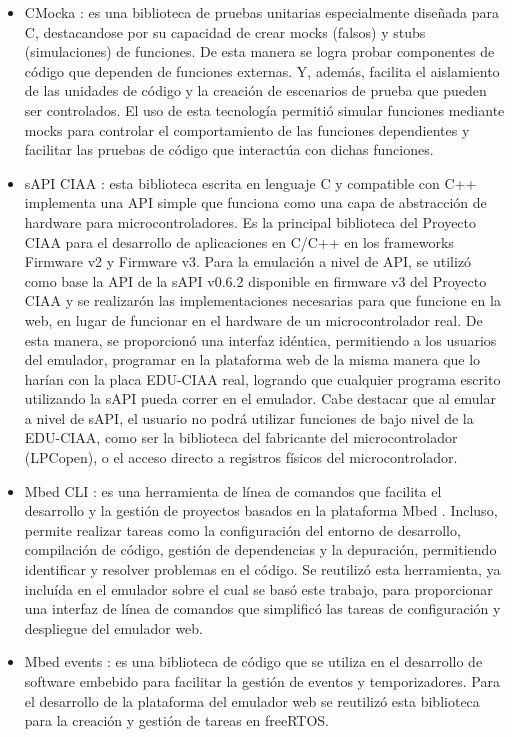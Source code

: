 \begin{itemize}
    \item CMocka \citep{CMocka}: es una biblioteca de pruebas unitarias especialmente diseñada para C, destacandose por su capacidad de crear mocks (falsos) y stubs (simulaciones) de funciones. De esta manera se logra probar componentes de código que dependen de funciones externas. Y, además, facilita el aislamiento de las unidades de código y la creación de escenarios de prueba que pueden ser controlados. El uso de esta tecnología permitió simular funciones mediante mocks para controlar el comportamiento de las funciones dependientes y facilitar las pruebas de código que interactúa con dichas funciones.
    
    \item sAPI CIAA \citep{sAPICIAA}: esta biblioteca escrita en lenguaje C y compatible con C++ implementa una API simple que funciona como una capa de abstracción de hardware para microcontroladores. Es la principal biblioteca del Proyecto CIAA para el desarrollo de aplicaciones en C/C++ en los frameworks Firmware v2\citep{firmwareV2} y Firmware v3\citep{firmwareV3}. 
Para la emulación a nivel de API, se utilizó como base la API de la sAPI v0.6.2 disponible en firmware v3 del Proyecto CIAA \citep{sAPIv0.6.2} y se realizarón las implementaciones necesarias para que funcione en la web, en lugar de funcionar en el hardware de un microcontrolador real.
De esta manera, se proporcionó una interfaz idéntica, permitiendo a los usuarios del emulador, programar en la plataforma web de la misma manera que lo harían con la placa EDU-CIAA real, logrando que cualquier programa escrito utilizando la sAPI pueda correr en el emulador.
Cabe destacar que al emular a nivel de sAPI, el usuario no podrá utilizar funciones de bajo nivel de la EDU-CIAA, como ser la biblioteca del fabricante del microcontrolador (LPCopen\citep{lpcopen}), o el acceso directo a registros físicos del microcontrolador.
    
    \item Mbed CLI \citep{MbedCLI}: es una herramienta de línea de comandos que facilita el desarrollo y la gestión de proyectos basados en la plataforma Mbed \citep{ArmMbed}. Incluso, permite realizar tareas como la configuración del entorno de desarrollo, compilación de código, gestión de dependencias y la depuración, permitiendo identificar y resolver problemas en el código. Se reutilizó esta herramienta, ya incluída en el emulador sobre el cual se basó este trabajo, para proporcionar una interfaz de línea de comandos que simplificó las tareas de configuración y despliegue del emulador web.
 
    
     \item Mbed events \citep{ArmMbed}: es una biblioteca de código que se utiliza en el desarrollo de software embebido para facilitar la gestión de eventos y temporizadores. Para el desarrollo de la plataforma del emulador web se reutilizó esta biblioteca para la creación y gestión de tareas en freeRTOS.
     
\end{itemize}


